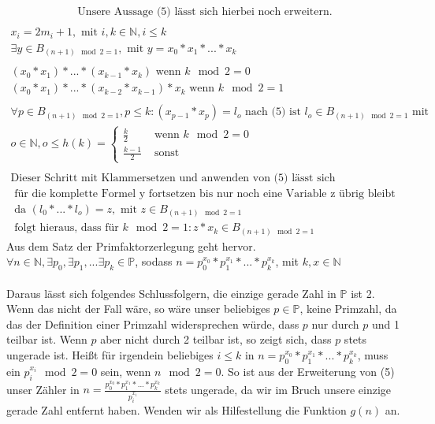 \documentclass{article}
\begin{document}
\begin{gather*}
\text {Unsere Aussage (5) lässt sich hierbei noch erweitern.}\\
\end{gather*}
\begin{gather*}
x_{i} = 2m_{i}+1, \text{ mit } i,k \in \mathbb{N}, i \leq k \\
\exists y \in B_{(n+1) \mod 2 = 1}, \text{ mit } y = x_{0} * x_{1} * ... * x_{k} \\\\
(x_{0} * x_{1}) * ... * (x_{k-1} * x_{k}) \text{ wenn } k \mod 2 = 0 \\
(x_{0} * x_{1}) * ... * (x_{k-2} * x_{k-1}) * x_{k} \text{ wenn } k \mod 2 = 1 \\\\
\forall p \in B_{(n+1) \mod 2 = 1}, p \leq k : (x_{p-1} * x_{p}) = l_{o} \text{ nach (5) ist } l_{o} \in B_{(n+1) \mod 2 = 1} \text{ mit } \\
o \in \mathbb{N}, o \leq h(k) = \begin{cases}
\frac{k}{2 }& \text{ wenn } k \mod 2 = 0 \\
\frac{k-1}{2} & \text{ sonst }
\end{cases} \\\\
\text{Dieser Schritt mit Klammersetzen und anwenden von (5) lässt sich} \\
\text{ für die komplette Formel y fortsetzen bis nur noch eine Variable z übrig bleibt} \\
\text { da } (l_{0} * ... * l_{o}) = z, \text{ mit } z \in B_{(n+1) \mod 2 = 1} \\ \text{ folgt hieraus, dass für } k \mod 2 = 1: z * x_{k} \in B_{(n+1) \mod 2 = 1}
\end{gather*} 
\newpage
\noindent Aus dem Satz der Primfaktorzerlegung geht hervor.\\
$\forall n \in \mathbb{N}, \exists p_{0}, \exists p_{1}, ... \exists p_{k} \in \mathbb{P}$, sodass $n = p_{0}^{x_{0}} * p_{1}^{x_{1}} * ... * p_{k}^{x_{k}}$, mit $k,x \in \mathbb{N}$\\\\
Daraus lässt sich folgendes Schlussfolgern, die einzige gerade Zahl in $\mathbb{P}$ ist 2. Wenn das nicht der Fall wäre, so wäre unser beliebiges $p \in \mathbb{P}$, keine Primzahl, da das der Definition einer Primzahl widersprechen würde, dass $p$ nur durch $p$ und 1 teilbar ist. Wenn $p$ aber nicht durch 2 teilbar ist, so zeigt sich, dass $p$ stets ungerade ist. Heißt für irgendein beliebiges $i \leq k$ in $n = p_{0}^{x_{0}} * p_{1}^{x_{1}} * ... * p_{k}^{x_{k}}$, muss ein $p_{i}^{x_{i}} \mod 2 = 0$ sein, wenn $n \mod 2 = 0$. So ist aus der Erweiterung von (5) unser Zähler in $n = \frac{p_{0}^{x_{0}} * p_{1}^{x_{1}} * ... * p_{k}^{x_{k}}}{p_{i}^{x_{i}}}$ stets ungerade, da wir im Bruch unsere einzige gerade Zahl entfernt haben. Wenden wir als Hilfestellung die Funktion $g(n)$ an.
\end{document}
